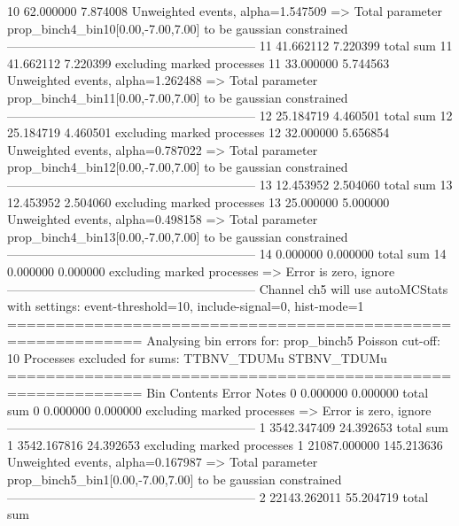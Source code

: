 10         62.000000       7.874008        Unweighted events, alpha=1.547509
  => Total parameter prop_binch4_bin10[0.00,-7.00,7.00] to be gaussian constrained
------------------------------------------------------------
11         41.662112       7.220399        total sum                     
11         41.662112       7.220399        excluding marked processes    
11         33.000000       5.744563        Unweighted events, alpha=1.262488
  => Total parameter prop_binch4_bin11[0.00,-7.00,7.00] to be gaussian constrained
------------------------------------------------------------
12         25.184719       4.460501        total sum                     
12         25.184719       4.460501        excluding marked processes    
12         32.000000       5.656854        Unweighted events, alpha=0.787022
  => Total parameter prop_binch4_bin12[0.00,-7.00,7.00] to be gaussian constrained
------------------------------------------------------------
13         12.453952       2.504060        total sum                     
13         12.453952       2.504060        excluding marked processes    
13         25.000000       5.000000        Unweighted events, alpha=0.498158
  => Total parameter prop_binch4_bin13[0.00,-7.00,7.00] to be gaussian constrained
------------------------------------------------------------
14         0.000000        0.000000        total sum                     
14         0.000000        0.000000        excluding marked processes    
  => Error is zero, ignore      
------------------------------------------------------------
Channel ch5 will use autoMCStats with settings: event-threshold=10, include-signal=0, hist-mode=1
============================================================
Analysing bin errors for: prop_binch5
Poisson cut-off: 10
Processes excluded for sums: TTBNV_TDUMu STBNV_TDUMu
============================================================
Bin        Contents        Error           Notes                         
0          0.000000        0.000000        total sum                     
0          0.000000        0.000000        excluding marked processes    
  => Error is zero, ignore      
------------------------------------------------------------
1          3542.347409     24.392653       total sum                     
1          3542.167816     24.392653       excluding marked processes    
1          21087.000000    145.213636      Unweighted events, alpha=0.167987
  => Total parameter prop_binch5_bin1[0.00,-7.00,7.00] to be gaussian constrained
------------------------------------------------------------
2          22143.262011    55.204719       total sum                     
